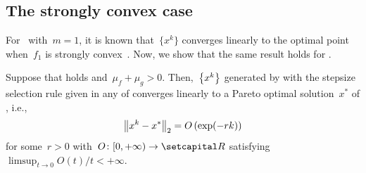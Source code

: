 \documentclass[../../main]{subfiles}
\begin{document}
\subsection{The strongly convex case}
For~ with~$m = 1$, it is known that~$\{x^k\}$ converges linearly to the optimal point when~$f_1$ is strongly convex~\cite{Beck2017}.
Now, we show that the same result holds for .
\begin{theorem} 
    Suppose that  holds and~$\mu_f + \mu_g > 0$.
    Then,~$\set*{x^k}$ generated by  with the stepsize selection rule given in any of  converges linearly to a Pareto optimal solution~$x^*$ of , i.e.,
    \begin{equation}
        \norm*{x^k - x^*}_2 = O\left(\exp(-rk)\right)
    \end{equation}
    for some~$r > 0$ with~$O \colon [0, + \infty) \to \setR$ satisfying~$\limsup_{t \to 0} O(t) / t < + \infty$.
\end{theorem}
\end{document}
